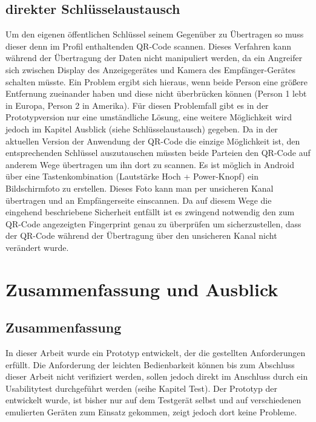 \documentclass[10pt, a4paper]{scrreprt}
\begin{document}
\section{direkter Schlüsselaustausch}
Um den eigenen öffentlichen Schlüssel seinem Gegenüber zu Übertragen so muss dieser denn im Profil enthaltenden QR-Code scannen. Dieses Verfahren kann während der Übertragung der Daten nicht manipuliert werden, da ein Angreifer sich zwischen Display des Anzeigegerätes und Kamera des Empfänger-Gerätes schalten müsste. Ein Problem ergibt sich hieraus, wenn beide Person eine größere Entfernung zueinander haben und diese nicht überbrücken können (Person 1 lebt in Europa, Person 2 in Amerika). Für diesen Problemfall gibt es in der Prototypversion nur eine umständliche Lösung, eine weitere Möglichkeit wird jedoch im Kapitel Ausblick (siehe Schlüsselaustausch) gegeben. Da in der aktuellen Version der Anwendung der QR-Code die einzige Möglichkeit ist, den entsprechenden Schlüssel auszutauschen müssten beide Parteien den QR-Code auf anderem Wege übertragen um ihn dort zu scannen. Es ist möglich in Android über eine Tastenkombination (Lautstärke Hoch + Power-Knopf) ein Bildschirmfoto zu erstellen. Dieses Foto kann man per unsicheren Kanal übertragen und an Empfängerseite einscannen. Da auf diesem Wege die eingehend beschriebene Sicherheit entfällt ist es zwingend notwendig den zum QR-Code angezeigten Fingerprint genau zu überprüfen um sicherzustellen, dass der QR-Code während der Übertragung über den unsicheren Kanal nicht verändert wurde.

% 

\chapter{Zusammenfassung und Ausblick}
\section{Zusammenfassung}
In dieser Arbeit wurde ein Prototyp entwickelt, der die gestellten Anforderungen erfüllt. Die Anforderung der leichten Bedienbarkeit können bis zum Abschluss dieser Arbeit nicht verifiziert werden, sollen jedoch direkt im Anschluss durch ein Usabilitytest durchgeführt werden (seihe Kapitel Test). Der Prototyp der entwickelt wurde, ist bisher nur auf dem Testgerät selbst und auf verschiedenen emulierten Geräten zum Einsatz gekommen, zeigt jedoch dort keine Probleme. 
\end{document}
